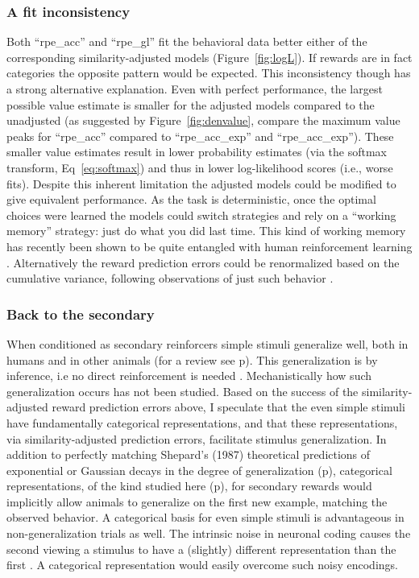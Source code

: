 \subsubsection{A fit inconsistency}
\label{subsub:inconsistency}
Both ``rpe\_acc'' and ``rpe\_gl'' fit the behavioral data better either of the corresponding similarity-adjusted models (Figure~\ref{fig:logL}).  If rewards are in fact categories the opposite pattern would be expected.  This inconsistency though has a strong alternative explanation.  Even with perfect performance, the largest possible value estimate is smaller for the adjusted models compared to the unadjusted (as suggested by Figure~\ref{fig:denvalue}, compare the maximum value peaks for ``rpe\_acc'' compared to ``rpe\_acc\_exp'' and ``rpe\_acc\_exp'').  These smaller value estimates result in lower probability estimates (via the softmax transform, Eq~\ref{eq:softmax}) and thus in lower log-likelihood scores (i.e., worse fits).  Despite this inherent limitation the adjusted models could be modified to give equivalent performance.  As the task is deterministic, once the optimal choices were learned the models could switch strategies and rely on a ``working memory'' strategy: just do what you did last time.  This kind of working memory has recently been shown to be quite entangled with human reinforcement learning \cite{Collins:2012p9779}.  Alternatively the reward prediction errors could be renormalized based on the cumulative variance, following observations of just such behavior \cite{Tobler:2005p6373}.


\subsubsection{Back to the secondary}
\label{sub:generalsense}
When conditioned as secondary reinforcers simple stimuli generalize well, both in humans and in other animals (for a review see p\pageref{subsub:birds}).  This generalization is by inference, i.e no direct reinforcement is needed \cite{Guttman:1956p8355,Nakamura:2006p9093,Smith:2011p9101}.  Mechanistically how such generalization occurs has not been studied.  Based on the success of the similarity-adjusted reward prediction errors above, I speculate that the even simple stimuli have fundamentally categorical representations, and that these representations, via similarity-adjusted prediction errors, facilitate stimulus generalization.  In addition to perfectly matching Shepard's (1987) theoretical predictions of exponential or Gaussian decays in the degree of generalization (p\pageref{subsub:curves}), categorical representations, of the kind studied here (p\pageref{subsub:catquant}), for secondary rewards would implicitly allow animals to generalize on the first new example, matching the observed behavior.  A categorical basis for even simple stimuli is advantageous in non-generalization trials as well. The intrinsic noise in neuronal coding causes the second viewing a stimulus to have a (slightly) different representation than the first \cite{Ashby:1986p9783}.  A categorical representation would easily overcome such noisy encodings. 

